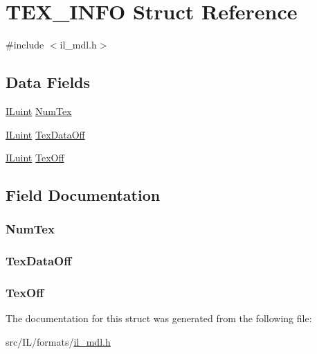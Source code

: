 \hypertarget{struct_t_e_x___i_n_f_o}{\section{T\-E\-X\-\_\-\-I\-N\-F\-O Struct Reference}
\label{struct_t_e_x___i_n_f_o}
}


{\ttfamily \#include $<$il\-\_\-mdl.\-h$>$}

\subsection*{Data Fields}
\begin{DoxyCompactItemize}
\item 
\hyperlink{il_8h_ac6508d0e9c19e32f32e00d54b5b8cf30}{I\-Luint} \hyperlink{struct_t_e_x___i_n_f_o_a382564856e178fc53e329da09c46d984}{Num\-Tex}
\item 
\hyperlink{il_8h_ac6508d0e9c19e32f32e00d54b5b8cf30}{I\-Luint} \hyperlink{struct_t_e_x___i_n_f_o_a9618e402380bc1d72d94212c5c0c2228}{Tex\-Data\-Off}
\item 
\hyperlink{il_8h_ac6508d0e9c19e32f32e00d54b5b8cf30}{I\-Luint} \hyperlink{struct_t_e_x___i_n_f_o_a6ac8f8d70e37b7190d45679d7604fd96}{Tex\-Off}
\end{DoxyCompactItemize}


\subsection{Field Documentation}
\hypertarget{struct_t_e_x___i_n_f_o_a382564856e178fc53e329da09c46d984}{
\subsubsection[{Num\-Tex}]{ Num\-Tex}}\label{struct_t_e_x___i_n_f_o_a382564856e178fc53e329da09c46d984}
\hypertarget{struct_t_e_x___i_n_f_o_a9618e402380bc1d72d94212c5c0c2228}{
\subsubsection[{Tex\-Data\-Off}]{ Tex\-Data\-Off}}\label{struct_t_e_x___i_n_f_o_a9618e402380bc1d72d94212c5c0c2228}
\hypertarget{struct_t_e_x___i_n_f_o_a6ac8f8d70e37b7190d45679d7604fd96}{
\subsubsection[{Tex\-Off}]{ Tex\-Off}}\label{struct_t_e_x___i_n_f_o_a6ac8f8d70e37b7190d45679d7604fd96}


The documentation for this struct was generated from the following file\-:\begin{DoxyCompactItemize}
\item 
src/\-I\-L/formats/\hyperlink{il__mdl_8h}{il\-\_\-mdl.\-h}\end{DoxyCompactItemize}
